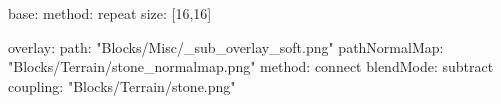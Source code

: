 base:
  method: repeat
  size: [16,16]

overlay:
  path: "Blocks/Misc/_sub_overlay_soft.png"
  pathNormalMap: "Blocks/Terrain/stone_normalmap.png"
  method: connect
  blendMode: subtract
  coupling: "Blocks/Terrain/stone.png"